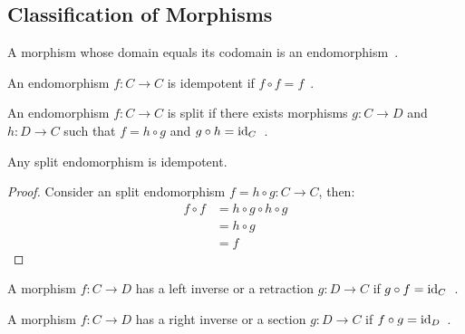 \subsection{Classification of Morphisms}

\begin{definition}[Endomorphism]
  A morphism whose domain equals its codomain is an
  endomorphism~\parencite[p.~7]{riehl:category_theory_in_context}.
\end{definition}

\begin{definition}[Idempotent]
  An endomorphism $f:C\to C$ is idempotent if $f\circ f =
  f$~\parencite[p.~20]{lane:working_mathematician}.
\end{definition}

\begin{definition}[Split]
  An endomorphism $f:C\to C$ is split if there exists morphisms $g:C\to D$ and
  $h:D\to C$ such that $f=h\circ g$ and $g\circ h=
  \mathrm{id}_{C}$~\parencite[p.~20]{lane:working_mathematician}.
\end{definition}

\begin{theorem}
  Any split endomorphism is idempotent.

  \begin{proof}
    Consider an split endomorphism $f=h\circ g:C\to C$, then:
    \[
      \begin{aligned}
        f\circ f &= h\circ g \circ h\circ g\\
        &= h\circ g\\
        &= f
      \end{aligned}
    \]
  \end{proof}
  \vspace{-\baselineskip}
\end{theorem}

\begin{definition}
  A morphism $f: C\to D$ has a left inverse or a retraction $g: D\to C$ if
  $g\circ f = \mathrm{id}_C$~\parencite[p.~19]{lane:working_mathematician}.
\end{definition}

\begin{definition}
  A morphism $f: C\to D$ has a right inverse or a section $g: D\to C$ if
  $f\circ g = \mathrm{id}_{D}$~\parencite[p.~19]{lane:working_mathematician}.
\end{definition}


